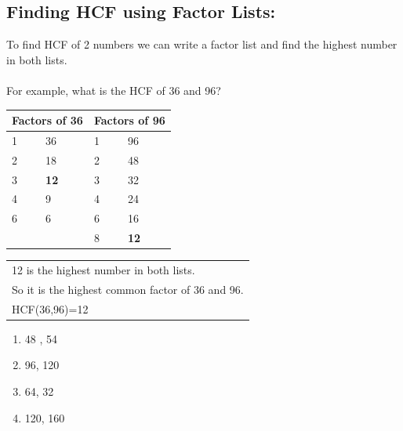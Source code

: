 \documentclass[a4paper,12pt]{article}
\begin{document}
\subsection{Finding HCF using Factor Lists:}
To find HCF of 2 numbers we can write a factor list and find the highest number in both lists.\\\\
For example, what is the HCF of 36 and 96?\\
\footnotesize
\begin{tabular}{|m{2cm}|m{2cm}||m{2cm}|m{2cm}|}\hline
	\multicolumn{2}{|c||}{Factors of 36}&\multicolumn{2}{c|}{Factors of 96}\\\hline
1&	36&	1&	96\\\hline
2&	18&	2&	48\\\hline
3&	\textbf{12}&	3&	32\\\hline
4&	9&	4&	24\\\hline
6&	6&	6&	16\\\hline
&&8&	\textbf{12}       \\\hline
\end{tabular}
\begin{tabular}{|m{5cm}|}\hline
12 is the highest number in both lists.\\
So it is the highest common factor of 36 and 96.\\
HCF(36,96)=12\\\hline
\end{tabular}\vspace{0.5cm}
\normalsize
\begin{tcolorbox}[colback=red!0!white, colframe=gray ,title=\subsubsection{Using Factor Lists, find the Highest Common Factor for:}\label{hcf1}]

\begin{multicols}{4}
	\begin{enumerate}[label= \roman*)]
		\item 48 , 54
		\item 96, 120
		\item 64, 32
		\item 120, 160
	\end{enumerate}
\end{multicols}
\end{tcolorbox}\vspace{0.5cm}
\end{document}
